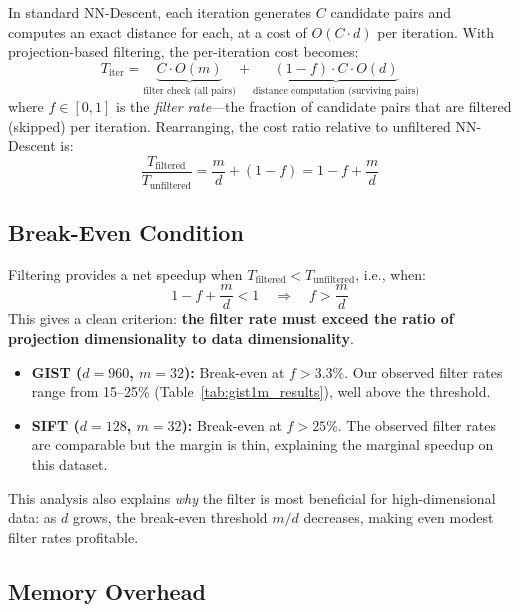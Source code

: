 In standard NN-Descent, each iteration generates $C$ candidate pairs and computes an exact distance for each, at a cost of $O(C \cdot d)$ per iteration.
With projection-based filtering, the per-iteration cost becomes:
\begin{equation}
    T_{\text{iter}} = \underbrace{C \cdot O(m)}_{\text{filter check (all pairs)}} + \underbrace{(1 - f) \cdot C \cdot O(d)}_{\text{distance computation (surviving pairs)}}
    \label{eq:iter_cost}
\end{equation}
where $f \in [0, 1]$ is the \emph{filter rate}---the fraction of candidate pairs that are filtered (skipped) per iteration.
Rearranging, the cost ratio relative to unfiltered NN-Descent is:
\begin{equation}
    \frac{T_{\text{filtered}}}{T_{\text{unfiltered}}} = \frac{m}{d} + (1 - f) = 1 - f + \frac{m}{d}
    \label{eq:cost_ratio}
\end{equation}

\subsection{Break-Even Condition}
\label{sec:breakeven}

Filtering provides a net speedup when $T_{\text{filtered}} < T_{\text{unfiltered}}$, i.e., when:
\begin{equation}
    1 - f + \frac{m}{d} < 1 \quad \Longrightarrow \quad f > \frac{m}{d}
    \label{eq:breakeven}
\end{equation}
This gives a clean criterion: \textbf{the filter rate must exceed the ratio of projection dimensionality to data dimensionality}.

\begin{itemize}
    \item \textbf{GIST ($d = 960$, $m = 32$):} Break-even at $f > 3.3\%$. Our observed filter rates range from 15--25\% (Table~\ref{tab:gist1m_results}), well above the threshold.
    \item \textbf{SIFT ($d = 128$, $m = 32$):} Break-even at $f > 25\%$. The observed filter rates are comparable but the margin is thin, explaining the marginal speedup on this dataset.
\end{itemize}

This analysis also explains \emph{why} the filter is most beneficial for high-dimensional data: as $d$ grows, the break-even threshold $m/d$ decreases, making even modest filter rates profitable.

\subsection{Memory Overhead}
\label{sec:memory}

